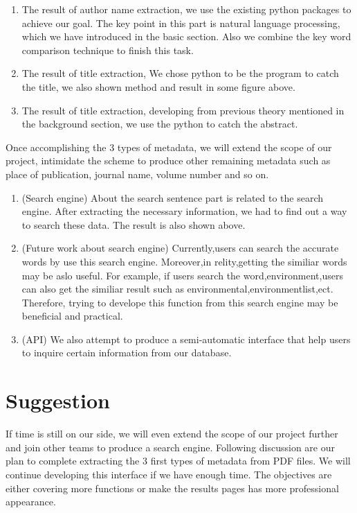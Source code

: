 		\begin{enumerate}
			\item The result of author name extraction, we use the existing python packages to achieve our goal.
			The key point in this part is natural language processing, which we have introduced in the basic section. 
			Also we combine the key word comparison technique to finish this task.
			\item The result of title extraction, We chose python to be the program to catch the title, we also shown method and result in some figure above.
			\item The result of title extraction, developing from previous theory mentioned in the background section, 
			we use the python to catch the abstract.
		\end{enumerate}	
Once accomplishing the 3 types of metadata, we will extend the scope of our project, intimidate the scheme to produce other remaining metadata such as place of publication, journal name, volume number and so on. 
		\begin{enumerate}
			\item (Search engine) About the search sentence part is related to the search engine. After extracting the necessary information, we had to find out a way to search these data. The result is also shown above.
			\item (Future work about search engine) Currently,users can search the accurate words by use this search engine.
			Moreover,in relity,getting the similiar words may be aslo useful. 
			For example, if users search the word,environment,users can also get the similiar result such as environmental,environmentlist,ect. Therefore, trying to develope this function from this search engine may be beneficial and practical.
			
			\item (API) We also attempt to produce a semi-automatic interface that help users to inquire certain information from our database.
		\end{enumerate}	

\section*{Suggestion}
If time is still on our side, we will even extend the scope of our project further and join other teams to produce a search engine. 
Following discussion are our plan to complete extracting the 3 first types of metadata from PDF files.
We will continue developing this interface if we have enough time. 
The objectives are either covering more functions or make the results pages has more professional appearance.
 
\newpage %